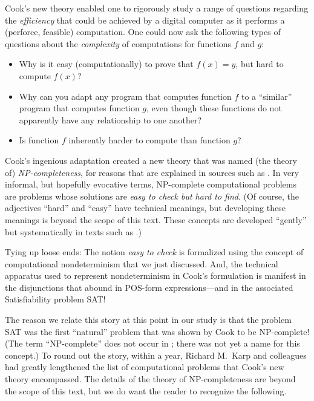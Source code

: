 {\noindent
Cook's new theory enabled one to rigorously study a range of questions regarding the {\em efficiency} that could be achieved by a digital computer as it performs a (perforce, feasible) computation.  One could now ask the following types of questions about the {\em complexity} of computations for functions $f$ and $g$:
\begin{itemize}
\item
Why is it easy (computationally) to prove that $f(x) = y$, but hard to compute $f(x)$?
\medskip\item
Why can you adapt any program that computes function $f$ to a ``similar'' program that computes function $g$, even though these functions do not apparently have any relationship to one another?
\medskip\item
Is function $f$ inherently harder to compute than function $g$?
\end{itemize}
Cook's ingenious adaptation created a new theory that was named (the theory of) {\it {\sf NP}-completeness}, for reasons that are explained in sources such as \cite{GareyJ79}.  In very informal, but hopefully evocative terms, {\sf NP}-complete computational problems are problems whose solutions are {\em easy to check but hard to find}.  (Of course, the adjectives ``hard'' and ``easy'' have technical meanings, but developing these meanings is beyond the scope of this text.  These concepts are developed ``gently'' but systematically in texts such as \cite{Rosenberg09}.)

\medskip

Tying up loose ends: The notion {\em easy to check} is formalized using the concept of computational nondeterminism that we just discussed.  And, the technical apparatus used to represent nondeterminism in Cook's formulation is manifest in the disjunctions that abound in POS-form expressions---and in the associated Satisfiability problem {\sf SAT}!


The reason we relate this story at this point in our study is that the problem {\sf SAT} was the first ``natural'' problem that was shown by Cook to be {\sf NP}-complete!  (The term ``{\sf NP}-complete'' does not occur in \cite{Cook71}; there was not yet a name for this concept.)  To round
out the story, within a year, Richard M.~Karp  and colleagues had greatly lengthened the list of computational problems that Cook's new theory encompassed.  The details of the theory of {\sf NP}-completeness are beyond the scope of this text, but we do want the reader to recognize the following.

}
